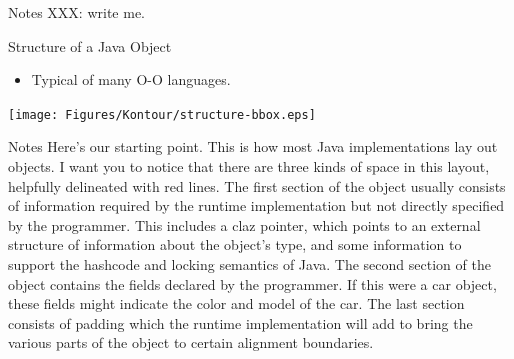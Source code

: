 \documentclass[%
pdf,
colorBG,
slideColor,
nototal,
oqe
]{prosper}
\newenvironment{talknotes}{\begin{slide}{Notes}\tiny}{\end{slide}}
\begin{document}
\begin{talknotes}
XXX: write me.
\end{talknotes}

\begin{slide}{Structure of a Java Object}
\begin{itemize}
\item Typical of many O-O languages.
\end{itemize}
\begin{center}
\texttt{[image: Figures/Kontour/structure-bbox.eps]}
\end{center}
\end{slide}

\begin{talknotes}
Here's our starting point.  This is how most Java implementations lay
out objects.  I want you to notice that there are three kinds of space
in this layout, helpfully delineated with red lines.  The first
section of the object usually consists of information required by
the runtime implementation but not directly specified by the
programmer.  This includes a claz pointer, which points to an
external structure of information about the object's type, and
some information to support the hashcode and locking semantics of
Java.  %
The second section of the object contains the fields declared by
the programmer.  If this were a car object, these fields might
indicate the color and model of the car.  The last section
consists of padding which the runtime implementation will
add to bring the various parts of the object to certain alignment
boundaries.
\end{talknotes}

\end{document}
